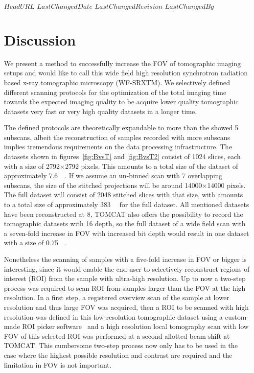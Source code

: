 \svnidlong
{$HeadURL$}
{$LastChangedDate$}
{$LastChangedRevision$}
{$LastChangedBy$}

\ifhtml
\else
\begin{center}
\end{center}
\fi

\section{Discussion}%
We present a method to successfully increase the FOV of tomographic imaging setups and would like to call this wide field high resolution synchrotron radiation based x-ray tomographic microscopy (WF-SRXTM). We selectively defined different scanning protocols for the optimization of the total imaging time towards the expected imaging quality to be acquire lower quality tomographic datasets very fast or very high quality datasets in a longer time.

The defined protocols are theoretically expandable to more than the showed 5 subscans, albeit the reconstruction of samples recorded with more subscans implies tremendous requirements on the data processing infrastructure. The datasets shown in figures~\ref{fig:BvsT} and \ref{fig:BvsT2} consist of 1024 slices, each with a size of 2792$\times$2792 pixels. This amounts to a total size of the dataset of approximately \SI{7.6}{\giga\byte}. If we assume an un-binned scan with 7 overlapping subscans, the size of the stitched projections will be around 14000$\times$14000 pixels. The full dataset will consist of 2048 stitched slices with that size, with amounts to a total size of approximately \SI{383}{\giga\byte} for the full dataset. All mentioned datasets have been reconstructed at \SI{8}{\bit}, TOMCAT also offers the possibility to record the tomographic datasets with \SI{16}{\bit} depth, so the full dataset of a wide field scan with a seven-fold increase in FOV with increased bit depth would result in one dataset with a size of \SI{0.75}{\tera\byte}.

Nonetheless the scanning of samples with a five-fold increase in FOV or bigger is interesting, since it would enable the end-user to selectively reconstruct regions of interest (ROI) from the sample with ultra-high resolution. Up to now a two-step process was required to scan ROI from samples larger than the FOV at the high resolution. In a first step, a registered overview scan of the sample at lower resolution and thus large FOV was acquired, then a ROI to be scanned with high resolution was defined in this low-resolution tomographic dataset using a custom-made ROI picker software~\cite{Heinzer2008} and a high resolution local tomography scan with low FOV of this selected ROI was performed at a second allotted beam shift at TOMCAT. This cumbersome two-step process now only has to be used in the case where the highest possible resolution and contrast are required and the limitation in FOV is not important.

